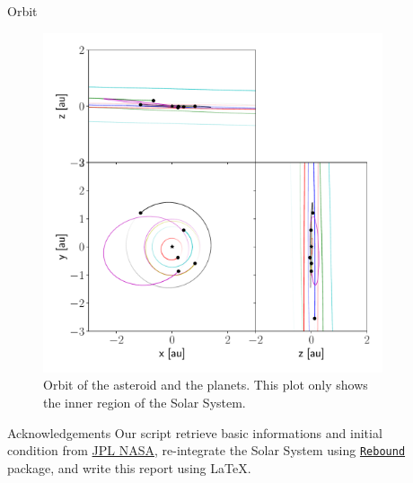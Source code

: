 \documentclass[final]{beamer}
\newlength{\sepwid}
\newlength{\onecolwid}
\newlength{\twocolwid}
\begin{document}
\begin{frame}[t]
\begin{columns}[t]
\begin{column}{\onecolwid}
\begin{block}{Orbit}
\begin{figure}
\includegraphics[width=0.99\textwidth]{initial_orbit.pdf}
\caption{Orbit of the asteroid and the planets. This plot only shows the inner region of the Solar System.}
\end{figure}
\end{block}

\begin{alertblock}{Acknowledgements}
Our script retrieve basic informations and initial condition from \href{https://ssd.jpl.nasa.gov/}{JPL NASA}, re-integrate the Solar System using \href{https://github.com/hannorein/rebound}{\texttt{Rebound}} package, and write this report using \LaTeX.
\end{alertblock}

\end{column}


\begin{column}{\sepwid}\end{column}

\begin{column}{\twocolwid}


\end{column}
\end{columns}
\end{frame}
\end{document}
